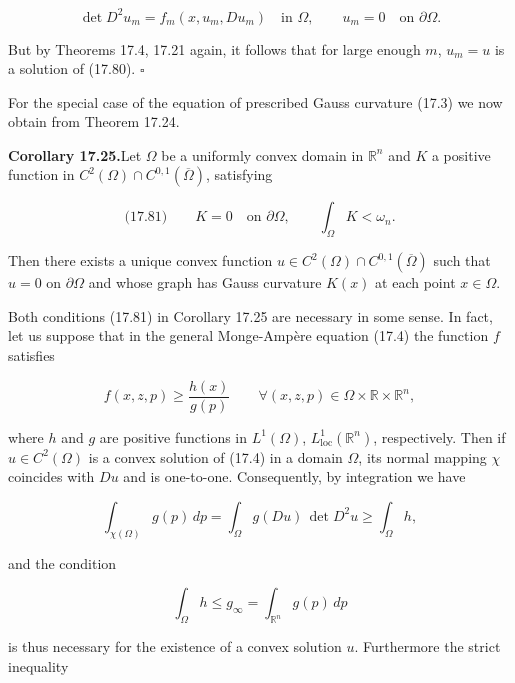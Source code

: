 \[
\det D^2u_m=f_m(x,u_m,Du_m)\quad\text{in }\Omega,\qquad u_m=0\quad\text{on }\partial\Omega.
\]

But by Theorems 17.4, 17.21 again, it follows that for large enough $m$, $u_m=u$ is a
solution of (17.80). \hfill $\square$

\medskip

For the special case of the equation of prescribed Gauss curvature (17.3) we now
obtain from Theorem 17.24.

\medskip

\textbf{Corollary 17.25.}\quad Let $\Omega$ be a uniformly convex domain in $\mathbb{R}^n$ and $K$ a positive function
in $C^2(\Omega)\cap C^{0,1}(\overline{\Omega})$, satisfying

\[
\text{(17.81)}\qquad K=0\quad\text{on }\partial\Omega,\qquad \int_\Omega K<\omega_n.
\]



Then there exists a unique convex function $u \in C^2(\Omega) \cap C^{0,1}(\overline{\Omega})$ such that $u = 0$ on $\partial \Omega$ and whose graph has Gauss curvature $K(x)$ at each point $x \in \Omega$.

Both conditions (17.81) in Corollary 17.25 are necessary in some sense. In fact, let us suppose that in the general Monge-Ampère equation (17.4) the function $f$ satisfies

\begin{equation}
\tag{17.82}
f(x, z, p) \geq \frac{h(x)}{g(p)} \qquad \forall (x, z, p) \in \Omega \times \mathbb{R} \times \mathbb{R}^n,
\end{equation}

where $h$ and $g$ are positive functions in $L^1(\Omega)$, $L^1_{\mathrm{loc}}(\mathbb{R}^n)$, respectively. Then if $u \in C^2(\Omega)$ is a convex solution of (17.4) in a domain $\Omega$, its normal mapping $\chi$ coincides with $Du$ and is one-to-one. Consequently, by integration we have

\[
\int_{\chi(\Omega)} g(p)\, dp = \int_{\Omega} g(Du)\, \det D^2u
\geq \int_{\Omega} h,
\]

and the condition

\begin{equation}
\tag{17.83}
\int_{\Omega} h \leq g_{\infty} = \int_{\mathbb{R}^n} g(p)\, dp
\end{equation}

is thus necessary for the existence of a convex solution $u$. Furthermore the strict inequality

